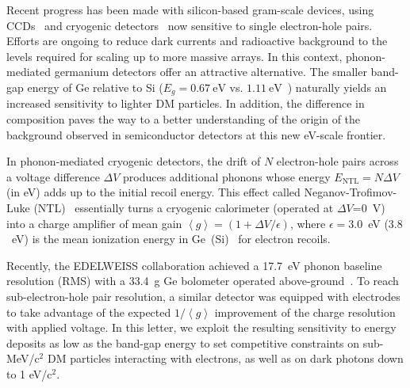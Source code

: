 \documentclass[aps,nofootinbib,floatfix,showpacs,preprintnumbers,twocolumn,superscriptaddress]{revtex4}
\begin{document}
Recent progress has been made with silicon-based gram-scale devices, using CCDs~\cite{SENSEI@MINOS,DAMIC-2019} and cryogenic detectors~\cite{CDMS-2019-erratum} now sensitive to single electron-hole pairs. Efforts are ongoing to reduce dark currents and radioactive background to the levels required for scaling up to more massive arrays. In this context, phonon-mediated germanium detectors offer an attractive alternative. The smaller band-gap energy of Ge relative to Si ($E_{g}=0.67~\mathrm{eV}$ vs. $1.11~\mathrm{eV}$~\cite{refgap1,refgap2}) naturally yields an increased sensitivity to lighter DM particles. In addition, the difference in composition paves the way to a better understanding of the origin of the background observed in semiconductor detectors at this new eV-scale frontier. 

In phonon-mediated cryogenic detectors, the drift of $N$ electron-hole pairs across a voltage difference $\Delta V$ produces additional phonons whose energy $E_{\mathrm{NTL}}=N\Delta V$ (in eV) adds up to the initial recoil energy. This effect called Neganov-Trofimov-Luke (NTL)~\cite{Neganov,Luke} essentially turns a cryogenic calorimeter (operated at $\Delta V$=0~V) into a charge amplifier of mean gain $\left<g\right>=(1+\Delta V/\epsilon)$,  where $\epsilon=3.0$~eV ($3.8$~eV) is the mean ionization energy in Ge~(Si)~\cite{Ge3eV} for electron recoils. %

Recently, the EDELWEISS collaboration achieved a 17.7~eV phonon baseline resolution (RMS) with a 33.4~g Ge bolometer operated above-ground~\cite{RED20}. To reach sub-electron-hole pair resolution, a similar detector was equipped with electrodes to take advantage of the expected $1/\left<g\right>$ improvement of the charge resolution with applied voltage. 
In this letter, we exploit the resulting sensitivity to energy deposits as low as the band-gap energy to set competitive constraints on sub-MeV/c$^2$ DM particles interacting with electrons, as well as on dark photons down to 1 eV/c$^2$. %
\end{document}
